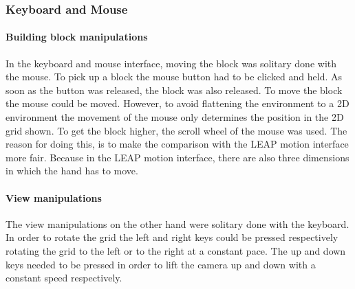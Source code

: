 \subsubsection{Keyboard and Mouse}

\paragraph{Building block manipulations}
In the keyboard and mouse interface, moving the block was solitary done with the mouse. To pick up a block the mouse button had to be clicked and held. As soon as the button was released, the block was also released. To move the block the mouse could be moved. However, to avoid flattening the environment to a 2D environment the movement of the mouse only determines the position in the 2D grid shown. To get the block higher, the scroll wheel of the mouse was used. The reason for doing this, is to make the comparison with the LEAP motion interface more fair. Because in the LEAP motion interface, there are also three dimensions in which the hand has to move.


\paragraph{View manipulations}
The view manipulations on the other hand were solitary done with the keyboard. In order to rotate the grid the left and right keys could be pressed respectively rotating the grid to the left or to the right at a constant pace. The up and down keys needed to be pressed in order to lift the camera up and down with a constant speed respectively.  